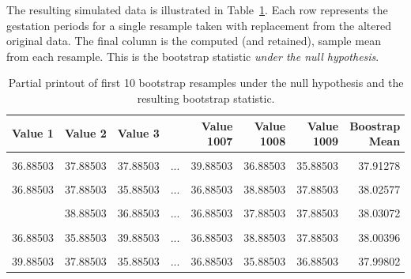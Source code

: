 \documentclass[
  letterpaper,
  DIV=11,
  numbers=noendperiod]{scrreprt}
\theoremstyle{plain}
\theoremstyle{definition}
\theoremstyle{definition}
\theoremstyle{remark}
\begin{document}
The resulting simulated data is illustrated in
Table~\ref{tbl-teststat-bootstrap-mean}. Each row represents the
gestation periods for a single resample taken with replacement from the
altered original data. The final column is the computed (and retained),
sample mean from each resample. This is the bootstrap statistic
\emph{under the null hypothesis}.

\begin{longtable}[t]{rrrlrrrr}

\caption{\label{tbl-teststat-bootstrap-mean}Partial printout of first 10
bootstrap resamples under the null hypothesis and the resulting
bootstrap statistic.}

\tabularnewline

\toprule
Value 1 & Value 2 & Value 3 &  & Value 1007 & Value 1008 & Value 1009 & Boostrap Mean\\
\midrule
\cellcolor{gray!10}{36.88503} & \cellcolor{gray!10}{36.88503} & \cellcolor{gray!10}{39.88503} & \cellcolor{gray!10}{...} & \cellcolor{gray!10}{36.88503} & \cellcolor{gray!10}{36.88503} & \cellcolor{gray!10}{37.88503} & \cellcolor{gray!10}{37.96234}\\
36.88503 & 37.88503 & 37.88503 & ... & 39.88503 & 36.88503 & 35.88503 & 37.91278\\
\cellcolor{gray!10}{37.88503} & \cellcolor{gray!10}{37.88503} & \cellcolor{gray!10}{37.88503} & \cellcolor{gray!10}{...} & \cellcolor{gray!10}{38.88503} & \cellcolor{gray!10}{37.88503} & \cellcolor{gray!10}{39.88503} & \cellcolor{gray!10}{37.94747}\\
36.88503 & 37.88503 & 35.88503 & ... & 36.88503 & 38.88503 & 37.88503 & 38.02577\\
\cellcolor{gray!10}{36.88503} & \cellcolor{gray!10}{36.88503} & \cellcolor{gray!10}{37.88503} & \cellcolor{gray!10}{...} & \cellcolor{gray!10}{38.88503} & \cellcolor{gray!10}{37.88503} & \cellcolor{gray!10}{40.88503} & \cellcolor{gray!10}{38.00198}\\
\addlinespace
39.88503 & 38.88503 & 36.88503 & ... & 36.88503 & 37.88503 & 37.88503 & 38.03072\\
\cellcolor{gray!10}{38.88503} & \cellcolor{gray!10}{38.88503} & \cellcolor{gray!10}{36.88503} & \cellcolor{gray!10}{...} & \cellcolor{gray!10}{37.88503} & \cellcolor{gray!10}{36.88503} & \cellcolor{gray!10}{38.88503} & \cellcolor{gray!10}{38.06938}\\
36.88503 & 35.88503 & 39.88503 & ... & 36.88503 & 38.88503 & 37.88503 & 38.00396\\
\cellcolor{gray!10}{37.88503} & \cellcolor{gray!10}{36.88503} & \cellcolor{gray!10}{37.88503} & \cellcolor{gray!10}{...} & \cellcolor{gray!10}{37.88503} & \cellcolor{gray!10}{35.88503} & \cellcolor{gray!10}{35.88503} & \cellcolor{gray!10}{37.96234}\\
39.88503 & 37.88503 & 35.88503 & ... & 36.88503 & 35.88503 & 36.88503 & 37.99802\\
\bottomrule

\end{longtable}
\end{document}
